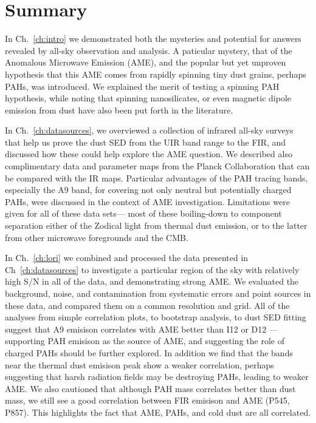 \chapter{Summary}
  \label{ch:Summary}

  In Ch.~\ref{ch:intro} we demonstrated both the mysteries and potential for answers revealed by all-sky observation and analysis. A paticular mystery, that of the Anomalous Microwave Emission (AME), and the popular but yet unproven hypothesis that this AME comes from rapidly spinning tiny dust grains, perhaps PAHs, was introduced. We explained the merit of testing a spinning PAH hypothesis, while noting that spinning nanosilicates, or even magnetic dipole emission from dust have also been put forth in the literature.

  In Ch.~\ref{ch:datasources}, we overviewed a collection of infrared all-sky surveys that help us prove the dust SED from the UIR band range to the FIR, and discussed how these could help explore the AME question. We described also complimentary data and parameter maps from the Planck Collaboration that can be compared with the IR maps. Particular advantages of the PAH tracing bands, especially the A9 band, for covering not only neutral but potentially charged PAHs, were discussed in the context of AME investigation. Limitations were given for all of these data sets--- most of these boiling-down to component separation either of the Zodical light from thermal dust emission, or to the latter from other microwave foregrounds and the CMB.

  In Ch.~\ref{ch:lori} we combined and processed the data presented in Ch~\ref{ch:datasources} to investigate a particular region of the sky with relatively high S/N in all of the data, and demonstrating strong AME. We evaluated the background, noise, and contamination from systematic errors and point sources in these data, and compared them on a common resolution and grid. All of the analyses from simple correlation plots, to bootstrap analysis, to dust SED fitting suggest that A9 emisison correlates with AME better than I12 or D12 --- supporting PAH emisison as the source of AME, and suggesting the role of charged PAHs should be further explored. In addition we find that the bands near the thermal dust emisison peak show a weaker correlation, perhaps suggesting that harsh radiation fields may be destroying PAHs, leading to weaker AME. We also cautioned that although PAH mass correlates better than dust mass, we still see a good correlation between FIR emisison and AME (P545, P857). This highlights the fact that AME, PAHs, and cold dust are all correlated.

